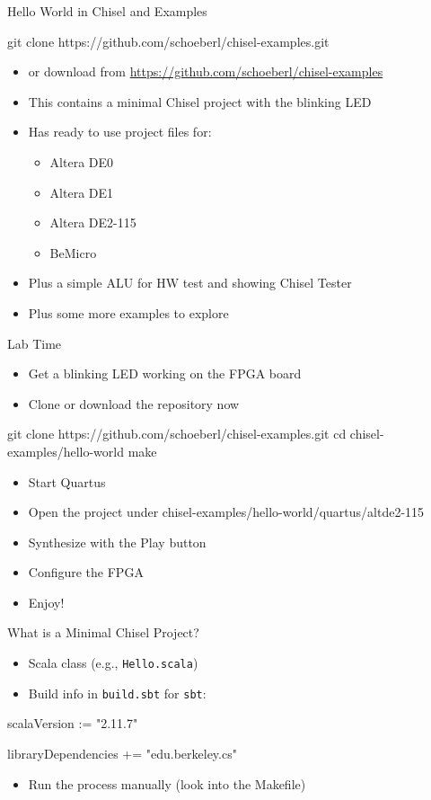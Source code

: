 \documentclass[xcolor=pdflatex,dvipsnames,table]{beamer}
\newcommand{\code}[1]{{\texttt{#1}}}
\begin{document}
\begin{frame}[fragile]{Hello World in Chisel and Examples}
\begin{chisel}
git clone https://github.com/schoeberl/chisel-examples.git
\end{chisel}
\begin{itemize}
\item or download from \url{https://github.com/schoeberl/chisel-examples}
\item This contains a minimal Chisel project with the blinking LED
\item Has ready to use project files for:
\begin{itemize}
\item Altera DE0
\item Altera DE1
\item Altera DE2-115
\item BeMicro
\end{itemize}
\item Plus a simple ALU for HW test and showing Chisel Tester
\item Plus some more examples to explore
\end{itemize}
\end{frame}

\begin{frame}[fragile]{Lab Time}
\begin{itemize}
\item Get a blinking LED working on the FPGA board
\item Clone or download the repository now
\end{itemize}
\begin{chisel}
git clone https://github.com/schoeberl/chisel-examples.git
cd chisel-examples/hello-world
make
\end{chisel}
\begin{itemize}
\item Start Quartus
\item Open the project under chisel-examples/hello-world/quartus/altde2-115
\item Synthesize with the Play button
\item Configure the FPGA
\item Enjoy!
\end{itemize}
\end{frame}

\begin{frame}[fragile]{What is a Minimal Chisel Project?}
\begin{itemize}
\item Scala class (e.g., \code{Hello.scala})
\item Build info in \code{build.sbt} for \code{sbt}:
\end{itemize}
\begin{chisel}
scalaVersion := "2.11.7"

libraryDependencies += "edu.berkeley.cs" %
\end{chisel}
\begin{itemize}
\item Run the process manually (look into the Makefile)
\end{itemize}
\end{frame}
\end{document}
